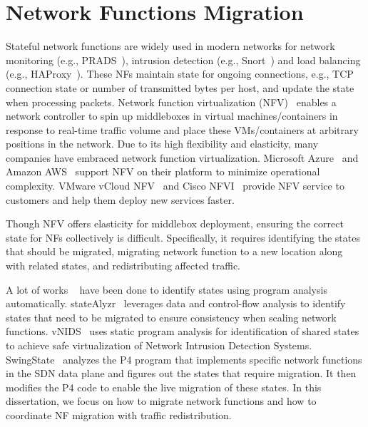 \section{Network Functions Migration}
\label{sec:nfv}
Stateful network functions are widely used in modern networks for network monitoring (e.g., PRADS~\cite{prads}), intrusion detection (e.g., Snort~\cite{snort}) and load balancing (e.g., HAProxy~\cite{HAProxy}). These NFs maintain state for ongoing connections, e.g., TCP connection state or number of transmitted bytes per host, and update the state when processing packets. Network function virtualization (NFV)~\cite{nfv} enables a network controller to spin up middleboxes in virtual machines/containers in response to real-time traffic volume and place these VMs/containers at arbitrary positions in the network. Due to its high flexibility and elasticity, many companies have embraced network function virtualization. Microsoft Azure~\cite{azure} and Amazon AWS~\cite{aws} support NFV on their platform to minimize operational complexity. VMware vCloud NFV~\cite{vmware} and Cisco NFVI~\cite{cisco} provide NFV service to customers and help them deploy new services faster.


Though NFV offers elasticity for middlebox deployment, ensuring the correct state for NFs collectively is difficult. Specifically, it requires identifying the states that should be migrated, migrating network function to a new location along with related states, and redistributing affected traffic. 

A lot of works ~\cite{stateAlyzr, swingstate, vnids} have been done to identify states using program analysis automatically. stateAlyzr~\cite{stateAlyzr} leverages data and control-flow analysis to identify states that need to be migrated to ensure consistency when scaling network functions. vNIDS~\cite{vnids} uses static program analysis for identification of shared states to achieve safe virtualization of Network Intrusion Detection Systems. SwingState~\cite{swingstate} analyzes the P4 program that implements specific network functions in the SDN data plane and figures out the states that require migration. It then modifies the P4 code to enable the live migration of these states. In this dissertation, we focus on how to migrate network functions and how to coordinate NF migration with traffic redistribution.

